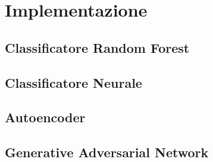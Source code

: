 \chapter{Implementazione}
\label{implementazione}


\section{Classificatore Random Forest}
\label{imp:randomforest}

\section{Classificatore Neurale}
\label{imp:classneurale}

\section{Autoencoder}
\label{imp:autoencoder}

\section{Generative Adversarial Network}
\label{imp:gan}

